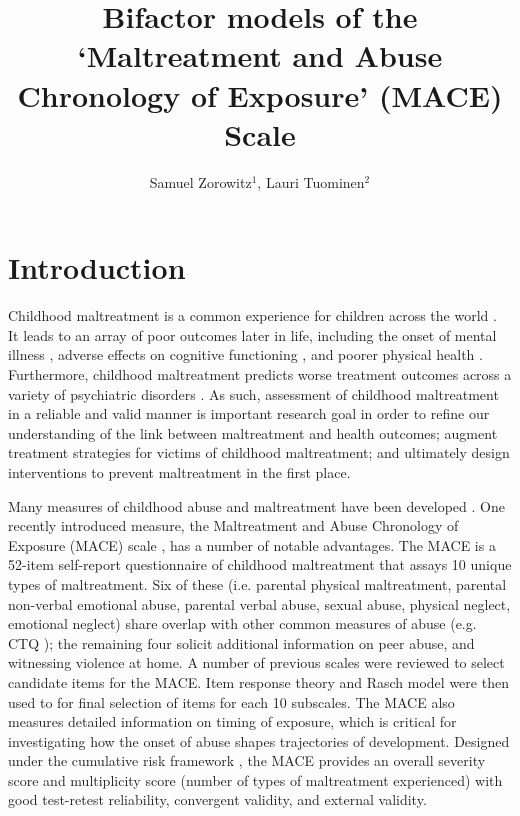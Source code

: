 \documentclass[letterpaper,man,natbib]{apa6}  %
\title{Bifactor models of the `Maltreatment and Abuse Chronology of Exposure' (MACE) Scale}
\author{Samuel Zorowitz$^1$, Lauri Tuominen$^{2}$}
\affiliation{$^1$Princeton Neuroscience Institute, Princeton University, USA\\$^2$The Royal’s Institute of Mental Health Research, University of Ottawa, Canada}
\begin{document}
\maketitle

\section{Introduction}


Childhood maltreatment is a common experience for children across the world \citep{stoltenborgh2015prevalence}. It leads to an array of poor outcomes later in life, including the onset of mental illness \citep{macmillan2001childhood, green2010childhood, kessler2010childhood}, adverse effects on cognitive functioning \citep{kavanaugh2017neurocognitive, r2018common, su2019does}, and poorer physical health \citep{wegman2009meta, widom2012prospective, goodwin2004association}. Furthermore, childhood maltreatment predicts worse treatment outcomes across a variety of psychiatric disorders \citep{nanni2012childhood, thomas2019childhood, schuckher2019history}. As such, assessment of childhood maltreatment in a reliable and valid manner is important research goal in order to refine our understanding of the link between maltreatment and health outcomes; augment treatment strategies for victims of childhood maltreatment; and ultimately design interventions to prevent maltreatment in the first place. 

Many measures of childhood abuse and maltreatment have been developed \citep{saini2019systematic}. One recently introduced measure, the Maltreatment and Abuse Chronology of Exposure (MACE) scale \citep{teicher2015maltreatment}, has a number of notable advantages. The MACE is a 52-item self-report questionnaire of childhood maltreatment that assays 10 unique types of maltreatment. Six of these (i.e. parental physical maltreatment, parental non-verbal emotional abuse, parental verbal abuse, sexual abuse, physical neglect, emotional neglect) share overlap with other common measures of abuse (e.g. CTQ \citep{bernstein1998childhood} ); the remaining four solicit additional information on peer abuse, and witnessing violence at home. A number of previous scales were reviewed to select candidate items for the MACE. Item response theory and Rasch model were then used to for final selection of items for each 10 subscales. The MACE also measures detailed information on timing of exposure, which is critical for investigating how the onset of abuse shapes trajectories of development. Designed under the cumulative risk framework \citep{evans2013cumulative}, the MACE provides an overall severity score and multiplicity score (number of types of maltreatment experienced) with good test-retest reliability, convergent validity, and external validity.
\end{document}
